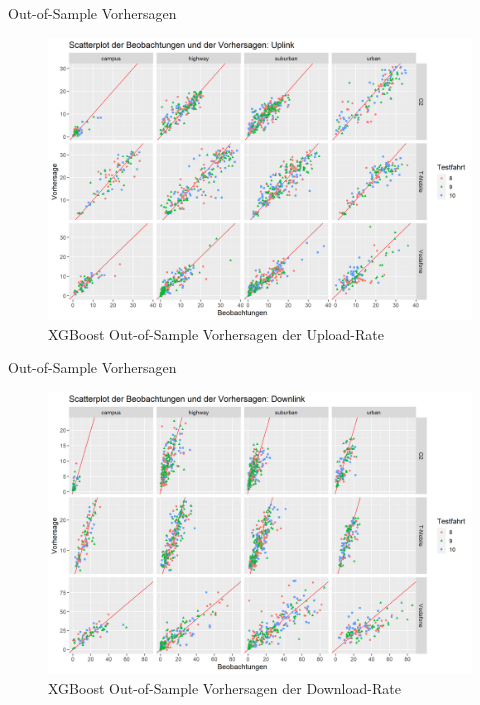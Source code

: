 \begin{frame}{Out-of-Sample Vorhersagen}
    \begin{figure}[h]
        \centering
        \includegraphics[scale=0.33]{plots/xgboost/uplink/scatter_colored}
        \caption{XGBoost Out-of-Sample Vorhersagen der Upload-Rate}
        \label{xgboost_scatter_colored_uplink}
    \end{figure}
\end{frame}

\begin{frame}{Out-of-Sample Vorhersagen}
    \begin{figure}[h]
        \centering
        \includegraphics[scale=0.33]{plots/xgboost/downlink/scatter_colored}
        \caption{XGBoost Out-of-Sample Vorhersagen der Download-Rate}
        \label{xgboost_scatter_colored_downlink}
    \end{figure}
\end{frame}